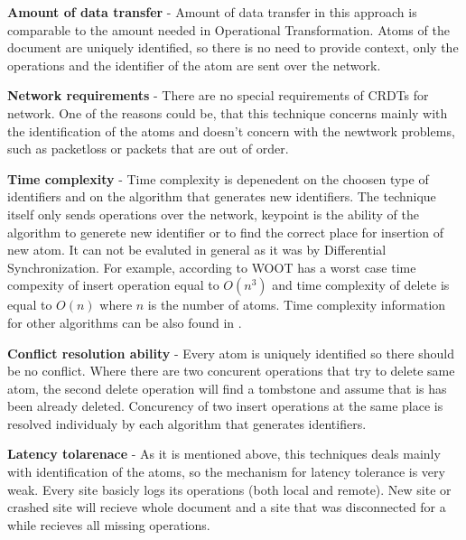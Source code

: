 \documentclass[12pt,oneside]{fithesis2}
\begin{document}
\vspace{3mm} 

\textbf{Amount of data transfer} - Amount of data transfer in this approach is comparable to the amount needed in Operational Transformation. Atoms of the document are uniquely identified, so there is no need to provide context, only the operations and the identifier of the atom are sent over the network.

\vspace{3mm} 

\textbf{Network requirements} - There are no special requirements of CRDTs for network. One of the reasons could be, that this technique concerns mainly with the identification of the atoms and doesn't concern with the newtwork problems, such as packetloss or packets that are out of order.

\vspace{3mm} 

\textbf{Time complexity} - Time complexity is depenedent on the choosen type of identifiers and on the algorithm that generates new identifiers. The technique itself only sends operations over the network, keypoint is the ability of the algorithm to generete new identifier or to find the correct place for insertion of new atom. It can not be evaluted in general as it was by Differential Synchronization. For example, according to \cite{CRDT-real} WOOT has a worst case time compexity of insert operation equal to \(O(n^3)\) and time complexity of delete is equal to \(O(n)\) where \(n\) is the number of atoms. Time complexity information for other algorithms can be also found in \cite{CRDT-real}.

\vspace{3mm} 

\textbf{Conflict resolution ability} - Every atom is uniquely identified so there should be no conflict. Where there are two concurent operations that try to delete same atom, the second delete operation will find a tombstone and assume that is has been already deleted. Concurency of two insert operations at the same place is resolved individualy by each algorithm that generates identifiers.

\vspace{3mm} 
\newpage
\textbf{Latency tolarenace} - As it is mentioned above, this techniques deals mainly with identification of the atoms, so the mechanism for latency tolerance is very weak. Every site basicly logs its operations (both local and remote). New site or crashed site will recieve whole document and a site that was disconnected for a while recieves all missing operations.\cite{Shapiro-design}
\end{document}
